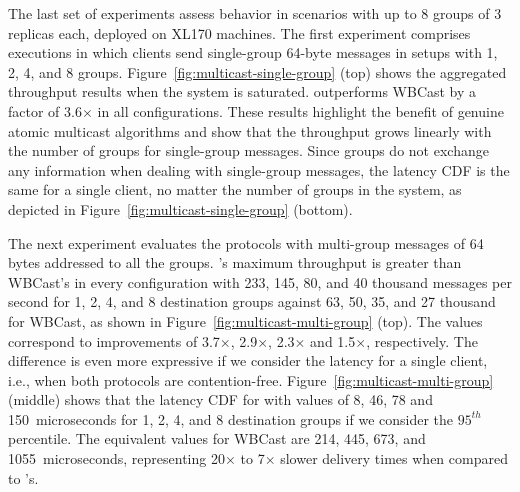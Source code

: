 The last set of experiments assess \libname behavior in scenarios with up to 8 groups of 3 replicas each, deployed on XL170 machines.
The first experiment comprises executions in which clients send single-group 64-byte messages in setups with 1, 2, 4, and 8 groups.
Figure~\ref{fig:multicast-single-group} (top) shows the aggregated throughput results when the system is saturated. 
\libname outperforms WBCast by a factor of 3.6$\times$ in all configurations.
These results highlight the benefit of genuine atomic multicast algorithms and show that the throughput grows linearly with the number of groups for single-group messages. 
Since groups do not exchange any information when dealing with single-group messages, the latency CDF is the same for a single client, no matter the number of groups in the system, as depicted in Figure~\ref{fig:multicast-single-group} (bottom).


The next experiment evaluates the protocols with multi-group messages of 64 bytes addressed to all the groups.
\libname's maximum throughput is greater than WBCast's in every configuration with 233, 145, 80, and 40 thousand messages per second for 1, 2, 4, and 8 destination groups against 63, 50, 35, and 27 thousand for WBCast, as shown in Figure~\ref{fig:multicast-multi-group} (top).
The values correspond to improvements of 3.7$\times$, 2.9$\times$, 2.3$\times$ and 1.5$\times$, respectively.
The difference is even more expressive if we consider the latency for a single client, i.e., when both protocols are contention-free. Figure~\ref{fig:multicast-multi-group} (middle) shows that the latency CDF for \libname with values of 8, 46, 78 and 150~microseconds for 1, 2, 4, and 8 destination groups if we consider the $95^{th}$ percentile. 
The equivalent values for WBCast are 214, 445, 673, and 1055~microseconds, representing 20$\times$ to 7$\times$ slower delivery times when compared to \libname's.

